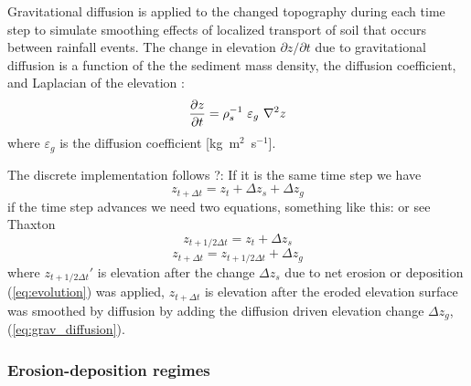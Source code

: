 \documentclass[gmd, manuscript]{copernicus}
\begin{document}
\noindent
Gravitational diffusion is applied to the changed topography during each time step
to simulate smoothing effects of localized transport of soil that
occurs between rainfall events.
The change in elevation $\partial z / \partial t$
due to gravitational diffusion
is a function of the the sediment mass density,
the diffusion coefficient, and Laplacian of the elevation
\citep{thaxton2004}:
\begin{equation}
\label{eq:grav_diffusion} 
{\partial z \over \partial t } = \rho_s^{-1} ~ \varepsilon_g ~ \nabla^2 z 
\end{equation}
\noindent
where $\varepsilon_g$ is the diffusion coefficient [\unit{kg~m}$^{2}$~\unit{s}$^{-1}$].

The discrete implementation follows \citep{Thaxton2004}?:
If it is the same time step we have
\begin{equation}
\label{eq:evolution_disc1} 
z_{t + \Delta t} = z_t + \Delta z_s + \Delta z_g 
\end{equation}
if the time step advances we need two equations, something like this: or see Thaxton
\begin{equation}
\label{eq:evolution_disc1} 
z_{t+ 1/2 \Delta t} = z_t + \Delta z_s  
\end{equation}
\begin{equation}
\label{eq:evolution_disc2} 
z_{t+\Delta t} = z_{t+1/2 \Delta t} + \Delta z_g 
\end{equation}
where $z_{t+ 1/2 \Delta t}'$ is elevation after the change $\Delta z_s$ due to net erosion or deposition (\ref{eq:evolution})
was applied, $z_{t+\Delta t}$ is elevation after the eroded elevation surface
was smoothed by diffusion by adding the diffusion driven elevation change $\Delta z_g$, (\ref{eq:grav_diffusion}).  

\subsubsection{Erosion-deposition regimes}
\end{document}

